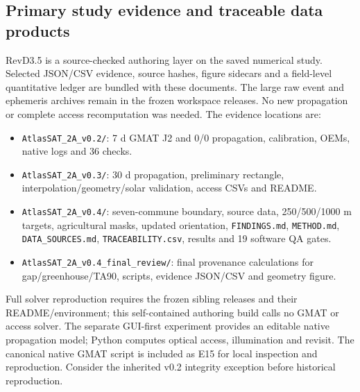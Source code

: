 \documentclass[10pt,a4paper]{article}
\begin{document}
\subsection{Primary study evidence and traceable data products}
RevD3.5 is a source-checked authoring layer on the saved numerical study. Selected JSON/CSV evidence, source hashes, figure sidecars and a field-level quantitative ledger are bundled with these documents. The large raw event and ephemeris archives remain in the frozen workspace releases. No new propagation or complete access recomputation was needed. The evidence locations are:
\begin{itemize}
\item \texttt{AtlasSAT\_2A\_v0.2/}: 7 d GMAT J2 and 0/0 propagation, calibration, OEMs, native logs and 36 checks.
\item \texttt{AtlasSAT\_2A\_v0.3/}: 30 d propagation, preliminary rectangle, interpolation/geometry/solar validation, access CSVs and README.
\item \texttt{AtlasSAT\_2A\_v0.4/}: seven-commune boundary, source data, 250/500/1000 m targets, agricultural masks, updated orientation, \texttt{FINDINGS.md}, \texttt{METHOD.md}, \texttt{DATA\_SOURCES.md}, \texttt{TRACEABILITY.csv}, results and 19 software QA gates.
\item \texttt{AtlasSAT\_2A\_v0.4\_final\_review/}: final provenance calculations for gap/greenhouse/TA90, scripts, evidence JSON/CSV and geometry figure.
\end{itemize}
Full solver reproduction requires the frozen sibling releases and their README/environment; this self-contained authoring build calls no GMAT or access solver. The separate GUI-first experiment provides an editable native propagation model; Python computes optical access, illumination and revisit. The canonical native GMAT script is included as E15 for local inspection and reproduction. Consider the inherited v0.2 integrity exception before historical reproduction.

\par
\end{document}

